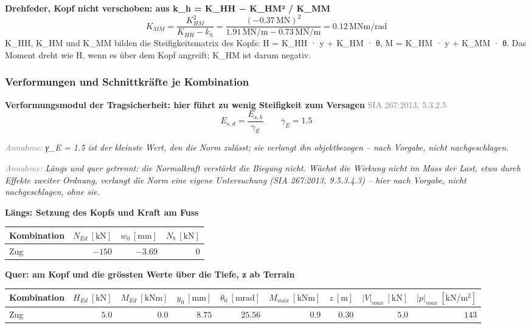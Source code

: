 \documentclass[11pt,a4paper]{article}
\newcommand{\normref}[1]{{\small\textcolor{gray}{#1}}}
\newcommand{\hinweis}[2]{\par\noindent\textcolor{gray}{\textit{#1:}} \textit{#2}\par}
\begin{document}
\noindent\textbf{Drehfeder, Kopf nicht verschoben: aus k\_h = K\_HH − K\_HM² / K\_MM}
\begin{equation*}
K_{MM} = \frac{K_{HM}^{2}}{K_{HH} - k_h} = \frac{\left(-0.37\,\mathrm{MN}\right)^{2}}{1.91\,\mathrm{MN}/\mathrm{m} - 0.73\,\mathrm{MN}/\mathrm{m}} = 0.12\,\mathrm{MNm}/\mathrm{rad}
\end{equation*}
K\_HH, K\_HM und K\_MM bilden die Steifigkeitsmatrix des Kopfs: H = K\_HH · y + K\_HM · θ, M = K\_HM · y + K\_MM · θ. Das Moment dreht wie H, wenn es über dem Kopf angreift; K\_HM ist darum negativ.

\subsubsection{Verformungen und Schnittkräfte je Kombination}
\noindent\textbf{Verformungsmodul der Tragsicherheit: hier führt zu wenig Steifigkeit zum Versagen} \hfill \normref{SIA 267:2013, 5.3.2.5}
\begin{equation*}
E_{s,d} = \frac{E_{s,k}}{\gamma_E} \qquad \gamma_E = 1.5
\end{equation*}
\hinweis{Annahme}{γ\_E = 1.5 ist der kleinste Wert, den die Norm zulässt; sie verlangt ihn objektbezogen -- nach Vorgabe, nicht nachgeschlagen.}
\hinweis{Annahme}{Längs und quer getrennt: die Normalkraft verstärkt die Biegung nicht. Wächst die Wirkung nicht im Mass der Last, etwa durch Effekte zweiter Ordnung, verlangt die Norm eine eigene Untersuchung (SIA 267:2013, 9.5.3.4.3) -- hier nach Vorgabe, nicht nachgeschlagen, ohne sie.}
\noindent\textbf{Längs: Setzung des Kopfs und Kraft am Fuss}
\begin{longtable}{lrrr}
\hline
Kombination & $N_{Ed}\ [\mathrm{kN}]$ & $w_0\ [\mathrm{mm}]$ & $N_b\ [\mathrm{kN}]$ \\
\hline
\endhead
Zug & $-150$ & $-3.69$ & $0$ \\
\hline
\end{longtable}
\noindent\textbf{Quer: am Kopf und die grössten Werte über die Tiefe, z ab Terrain}
\begin{longtable}{lrrrrrrrr}
\hline
Kombination & $H_{Ed}\ [\mathrm{kN}]$ & $M_{Ed}\ [\mathrm{kNm}]$ & $y_0\ [\mathrm{mm}]$ & $\theta_0\ [\mathrm{mrad}]$ & $M_{max}\ [\mathrm{kNm}]$ & $z\ [\mathrm{m}]$ & $|V|_{max}\ [\mathrm{kN}]$ & $|p|_{max}\ [\mathrm{kN/m^2}]$ \\
\hline
\endhead
Zug & $5.0$ & $0.0$ & $8.75$ & $25.56$ & $0.9$ & $0.30$ & $5.0$ & $143$ \\
\hline
\end{longtable}
\end{document}
